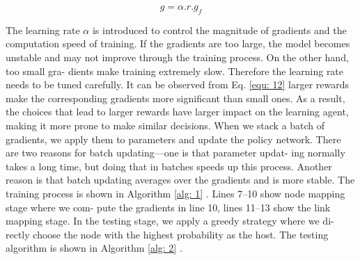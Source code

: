 \documentclass[12pt]{article}
\begin{document}
\begin{equation}
g = \alpha . r . g_f
\label{equ: 12}
\end{equation}


The learning rate $\alpha$ is introduced to control the magnitude of
gradients and the computation speed of training. If the gradients
are too large, the model becomes unstable and may not improve
through the training process. On the other hand, too small gra-
dients make training extremely slow. Therefore the learning rate
needs to be tuned carefully. It can be observed from Eq. \ref{equ: 12} larger
rewards make the corresponding gradients more significant than
small ones. As a result, the choices that lead to larger rewards
have larger impact on the learning agent, making it more prone
to make similar decisions. When we stack a batch of gradients, we
apply them to parameters and update the policy network. There
are two reasons for batch updating—one is that parameter updat-
ing normally takes a long time, but doing that in batches speeds up
this process. Another reason is that batch updating averages over
the gradients and is more stable. The training process is shown in
Algorithm \ref{alg: 1} . Lines 7–10 show node mapping stage where we com-
pute the gradients in line 10, lines 11–13 show the link mapping
stage.
In the testing stage, we apply a greedy strategy where we di-
rectly choose the node with the highest probability as the host.
The testing algorithm is shown in Algorithm \ref{alg: 2} .
\end{document}
